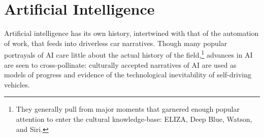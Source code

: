 
\section{Artificial Intelligence}


Artificial intelligence has its own history, intertwined with that of the
automation of work, that feeds into driverless car narratives. Though many popular
portrayals of AI care little about the actual history of the
field,\footnote{They generally pull from major moments that garnered enough popular
attention to enter the cultural knowledge-base: ELIZA, Deep Blue,
Watson, and Siri.} advances in AI are seen to cross-pollinate: culturally accepted narratives of AI are used
as models of progress and evidence of the technological inevitability
of self-driving vehicles. 


